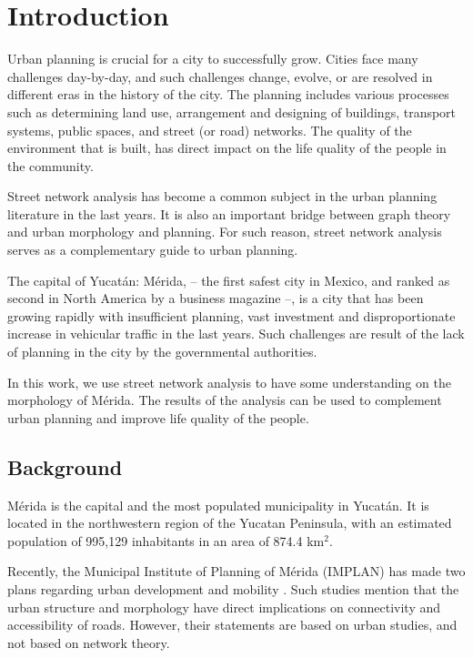 \chapter{Introduction}
\label{cha:introduction}

Urban planning is crucial for a city to successfully grow. Cities face many challenges day-by-day, and such challenges change, evolve, or are resolved in different eras in the history of the city. The planning includes various processes such as determining land use, arrangement and designing of buildings, transport systems, public spaces, and street (or road) networks. The quality of the environment that is built, has direct impact on the life quality of the people in the community.

Street network analysis has become a common subject in the urban planning literature in the last years. It is also an important bridge between graph theory and urban morphology and planning. For such reason, street network analysis serves as a complementary guide to urban planning.

The capital of Yucatán: Mérida, -- the first safest city in Mexico, and ranked as second in North America by a business magazine \cite{ceoworldmag_2019}--, is a city that has been growing rapidly with insufficient planning, vast investment and disproportionate increase in vehicular traffic in the last years. Such challenges are result of the lack of planning in the city by the governmental authorities.

In this work, we use street network analysis to have some understanding on the morphology of Mérida. The results of the analysis can be used to complement urban planning and improve life quality of the people.

\section{Background}

Mérida is the capital and the most populated municipality in Yucatán. It is located in the northwestern region of the Yucatan Peninsula, with an estimated population of 995,129 inhabitants in an area of 874.4 km$^2$.

Recently, the Municipal Institute of Planning of Mérida (IMPLAN) has made two plans regarding urban development and mobility \cite{PMDU_2017, PIMUS_2019}. Such studies mention that the urban structure and morphology have direct implications on connectivity and accessibility of roads. However, their statements are based on urban studies, and not based on network theory.

